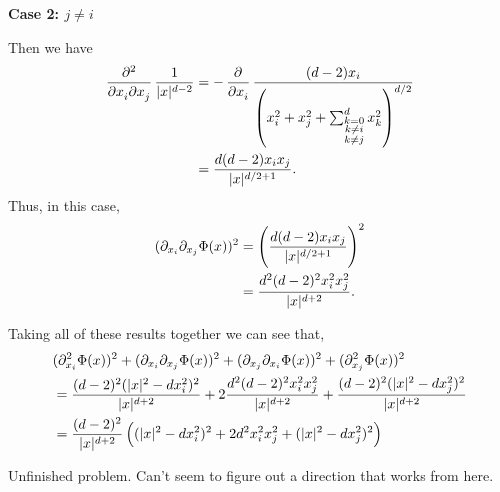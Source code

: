 \documentclass{article}
\begin{document}
\textbf{Case 2: $j \neq i$}

Then we have
%
\begin{align*}
    \dmd{}{2}{x_i}{}{x_j}{} \frac{1}{|x|^{d - 2}}
        &= - \dpd{}{x_i} \frac{(d - 2) x_i}{\del{x_i^2 + x_j^2 + \sum_{\substack{k = 0 \\ k \neq i \\ k \neq j}}^d x_k^2
}^{d/2}} \\
        &= \frac{d (d - 2) x_i x_j}{|x|^{d/2 + 1}}
    .
\end{align*}
%
Thus, in this case,
%
\begin{align*}
    (\partial_{x_i} \partial_{x_j} \Phi(x))^2
        &= \del{\frac{d (d - 2) x_i x_j}{|x|^{d/2 + 1}}}^2 \\
        &= \frac{d^2 (d - 2)^2 x_i^2 x_j^2}{|x|^{d + 2}}
        .
\end{align*}

Taking all of these results together we can see that,
%
\begin{align*}
    &(\partial_{x_i}^2 \Phi(x))^2
        + (\partial_{x_i} \partial_{x_j} \Phi(x))^2
        + (\partial_{x_j} \partial_{x_i} \Phi(x))^2
        + (\partial_{x_j}^2 \Phi(x))^2 \\
    &= \frac{(d - 2)^2 (|x|^2 - d x_i^2)^2}{|x|^{d + 2}}
        + 2 \frac{d^2 (d - 2)^2 x_i^2 x_j^2}{|x|^{d + 2}}
        + \frac{(d - 2)^2 (|x|^2 - d x_j^2)^2}{|x|^{d + 2}} \\
    &= \frac{(d - 2)^2}{|x|^{d + 2}} \del{
            (|x|^2 - d x_i^2)^2
            + 2 d^2 x_i^2 x_j^2
            + (|x|^2 - d x_j^2)^2
        } \\
\end{align*}

Unfinished problem. Can't seem to figure out a direction that works from here.
\end{document}
